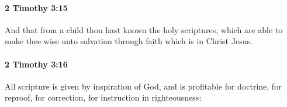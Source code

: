 		\paragraph{2 Timothy 3:15} %
			\label{2TIMOTHY-3-15}

			And that from a child thou hast known the holy scriptures, which are able to make thee wise unto salvation through faith which is in Christ Jesus.

			\begin{framed}
			\scriptsize
				\begin{compactdesc}
					\item[SBLG] 
				\end{compactdesc}
			\end{framed}

		\paragraph{2 Timothy 3:16} %
			\label{2TIMOTHY-3-16}

			All scripture is given by inspiration of God, and is profitable for doctrine, for reproof, for correction, for instruction in righteousness:

